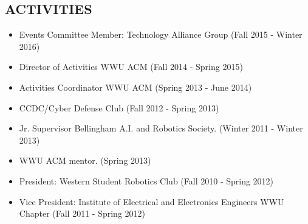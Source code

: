 \documentclass[line,margin]{res}
\begin{document}
\begin{resume}
\section{ACTIVITIES}
    \begin{itemize} \itemsep -3pt
    \item Events Committee Member: Technology Alliance Group {\footnotesize (Fall 2015 - Winter 2016)}
    \item Director of Activities WWU ACM {\footnotesize (Fall 2014 - Spring 2015)}
    \item Activities Coordinator WWU ACM {\footnotesize (Spring 2013 - June 2014)}
    \item CCDC/Cyber Defense Club {\footnotesize (Fall 2012 - Spring 2013)}
    \item Jr. Supervisor Bellingham A.I. and Robotics Society. {\footnotesize (Winter 2011 - Winter 2013)}
    \item WWU ACM mentor. {\footnotesize (Spring 2013)}
    \item President: Western Student Robotics Club {\footnotesize(Fall 2010 - Spring 2012)}
    \item Vice President: Institute of Electrical and Electronics Engineers WWU Chapter {\footnotesize(Fall 2011 - Spring 2012)}
    \end{itemize}

\end{resume}
\end{document}
